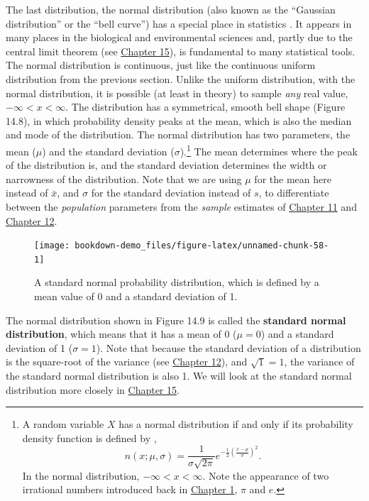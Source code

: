 \documentclass[
]{scrbook}
\begin{document}
The last distribution, the normal distribution (also known as the ``Gaussian distribution'' or the ``bell curve'') has a special place in statistics \citep{Miller2004, Navarro2022}.
It appears in many places in the biological and environmental sciences and, partly due to the central limit theorem (see \protect\hyperlink{Chapter_15}{Chapter 15}), is fundamental to many statistical tools.
The normal distribution is continuous, just like the continuous uniform distribution from the previous section.
Unlike the uniform distribution, with the normal distribution, it is possible (at least in theory) to sample \emph{any} real value, \(-\infty < x < \infty\).
The distribution has a symmetrical, smooth bell shape (Figure 14.8), in which probability density peaks at the mean, which is also the median and mode of the distribution.
The normal distribution has two parameters, the mean (\(\mu\)) and the standard deviation (\(\sigma\)).\footnote{A random variable \(X\) has a normal distribution if and only if its probability density function is defined by \citep{Miller2004}, \[n\left(x; \mu, \sigma\right) = \frac{1}{\sigma\sqrt{2\pi}}e^{-\frac{1}{2}\left(\frac{x - \mu}{\sigma}\right)^{2}}.\] In the normal distribution, \(-\infty < x < \infty\). Note the appearance of two irrational numbers introduced back in \protect\hyperlink{Chapter_1}{Chapter 1}, \(\pi\) and \(e\).}
The mean determines where the peak of the distribution is, and the standard deviation determines the width or narrowness of the distribution.
Note that we are using \(\mu\) for the mean here instead of \(\bar{x}\), and \(\sigma\) for the standard deviation instead of \(s\), to differentiate between the \emph{population} parameters from the \emph{sample} estimates of \protect\hyperlink{Chapter_11}{Chapter 11} and \protect\hyperlink{Chapter_12}{Chapter 12}.

\begin{figure}
\texttt{[image: bookdown-demo\_files/figure-latex/unnamed-chunk-58-1]} \caption{A standard normal probability distribution, which is defined by a mean value of 0 and a standard deviation of 1.}\label{fig:unnamed-chunk-58}
\end{figure}

The normal distribution shown in Figure 14.9 is called the \textbf{standard normal distribution}, which means that it has a mean of 0 (\(\mu = 0\)) and a standard deviation of 1 (\(\sigma = 1\)).
Note that because the standard deviation of a distribution is the square-root of the variance (see \protect\hyperlink{Chapter_12}{Chapter 12}), and \(\sqrt{1} = 1\), the variance of the standard normal distribution is also 1.
We will look at the standard normal distribution more closely in \protect\hyperlink{Chapter_15}{Chapter 15}.
\end{document}
